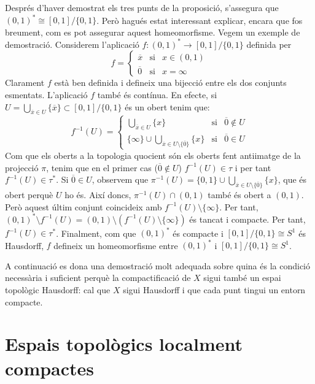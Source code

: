 \documentclass{article}
\begin{document}
\par
Després d'haver demostrat els tres punts de la proposició, s'assegura que $(0,1)^* \cong[0,1]/\{0,1\}$. Però hagués estat interessant explicar, encara que fos breument, com es pot assegurar aquest homeomorfisme. Vegem un exemple de demostració. Considerem l'aplicació $f:{(0,1)}^*\rightarrow[0,1]/\{0,1\}$ definida per $$f=\left\{
  \begin{array}{ccc}
    \overline{x} & \text{si} & x\in(0,1) \\
    \overline{0} & \text{si} & x=\infty
  \end{array}
  \right.$$
Clarament $f$ està ben definida i defineix una bijecció entre els dos conjunts esmentats. L'aplicació $f$ també és contínua. En efecte, si $U=\bigcup_{\overline{x}\in U}\{\overline{x}\}\subset [0,1]/\{0,1\}$ és un obert tenim que: $$f^{-1}(U)=\left\{
  \begin{array}{ccc}
    \bigcup_{\overline{x}\in U}\{x\}                                        & \text{si} & \overline{0}\notin U \\
    \{\infty\}\cup\bigcup_{\overline{x}\in U\setminus\{\overline{0}\}}\{x\} & \text{si} & \overline{0}\in U
  \end{array}
  \right.$$
Com que els oberts a la topologia quocient són els oberts fent antiimatge de la projecció $\pi$, tenim que en el primer cas ($\overline{0}\notin U $) $f^{-1}(U)\in\tau$ i per tant $f^{-1}(U)\in\tau^*$. Si $\overline{0}\in U$, observem que $\pi^{-1}(U)=\{0,1\}\cup\bigcup_{\overline{x}\in U\setminus\{\overline{0}\}}\{x\}$, que és obert perquè $U$ ho és. Així doncs, $\pi^{-1}(U)\cap(0,1)$ també és obert a $(0,1)$. Però aquest últim conjunt coincideix amb $f^{-1}(U)\setminus\{\infty\}$. Per tant, $(0,1)^*\setminus f^{-1}(U)=(0,1)\setminus (f^{-1}(U)\setminus\{\infty\})$ és tancat i compacte. Per tant, $f^{-1}(U)\in\tau^*$.
Finalment, com que ${(0,1)}^*$ és compacte i $[0,1]/\{0,1\}\cong S^1$ és Hausdorff, $f$ defineix un homeomorfisme entre ${(0,1)}^*$ i $[0,1]/\{0,1\}\cong S^1$.

\par
A continuació es dona una demostració molt adequada sobre quina és la condició necessària i suficient perquè la compactificació de $X$ sigui també un espai topològic Hausdorff: cal que $X$ sigui Hausdorff i que cada punt tingui un entorn compacte.
\section{Espais topològics localment compactes}
\end{document}
